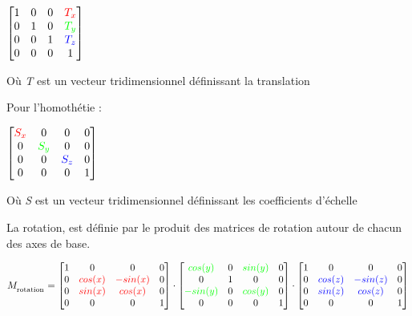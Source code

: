 \documentclass[pdftex, 11pt, a4paper, titlepage]{article}
\begin{document}
\begin{math}
  \begin{bmatrix}
    1 & 0 & 0 & \color{red}{T_x} \\
    0 & 1 & 0 & \color{green}{T_y} \\
    0 & 0 & 1 & \color{blue}{T_z} \\
    0 & 0 & 0 & 1
  \end{bmatrix}
\end{math}

Où \emph{T} est un vecteur tridimensionnel définissant la translation

Pour l'homothétie :

\begin{math}
  \begin{bmatrix}
    \color{red}{S_x} & 0                  & 0                 & 0 \\
    0                & \color{green}{S_y} & 0                 & 0 \\
    0                & 0                  & \color{blue}{S_z} & 0 \\
    0 & 0 & 0 & 1
  \end{bmatrix}
\end{math}

Où \emph{S} est un vecteur tridimensionnel définissant les
coefficients d'échelle

La rotation, est définie par le produit des matrices de rotation
autour de chacun des axes de base.

\begin{math}
  M_\textsubscript{rotation} =
  \begin{bmatrix}
    1 & 0     & 0        & 0 \\
    0 & \color{red}{cos(x)} & \color{red}{-sin(x)} & 0 \\
    0 & \color{red}{sin(x)} & \color{red}{cos(x)}  & 0 \\
    0 & 0 & 0 & 1
  \end{bmatrix}
  \cdot
  \begin{bmatrix}
    \color{green}{cos(y)}  & 0 & \color{green}{sin(y)}    & 0 \\
    0                    & 1 & 0                        & 0 \\
    \color{green}{-sin(y)} & 0 & \color{green}{cos(y)}    & 0 \\
    0 & 0 & 0 & 1
  \end{bmatrix}
  \cdot
  \begin{bmatrix}
    1 & 0      & 0       & 0 \\
    0 & \color{blue}{cos(z)} & \color{blue}{-sin(z)} & 0 \\
    0 & \color{blue}{sin(z)} & \color{blue}{cos(z)}  & 0 \\
    0 & 0 & 0 & 1
  \end{bmatrix}
\end{math}
\end{document}
